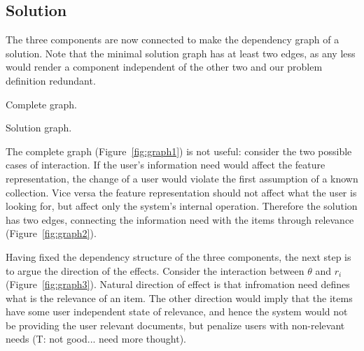 \documentclass[10pt]{tufte-handout}
\begin{document}
\subsection{Solution}
The three components are now connected to make the dependency graph of a solution. Note that the minimal solution graph has at least two edges, as any less would render a component independent of the other two and our problem definition redundant.

\begin{marginfigure}%
\caption{Complete graph.}
\label{fig:graph1}
\end{marginfigure}

\begin{marginfigure}%
\caption{Solution graph.}
\label{fig:graph2}
\end{marginfigure}

The complete graph (Figure~\ref{fig:graph1}) is not useful: consider
the two possible cases of interaction. If the user's information need would
affect the feature representation, the change of a user would violate
the first assumption of a known collection. Vice versa the feature
representation should not affect what the user is looking for, but
affect only the system's internal operation. Therefore the solution
has two edges, connecting the information need with the items through
relevance (Figure~\ref{fig:graph2}).

Having fixed the dependency structure of the three components, the
next step is to argue the direction of the effects. Consider the interaction between $\theta$ and $r_i$ (Figure~\ref{fig:graph3}). Natural direction of effect is that infromation need defines what is the relevance of an item. The other direction would imply that the items have some user independent state of relevance, and hence the system would not be providing the user relevant documents, but penalize users with non-relevant needs (T: not good... need more thought).
\end{document}
